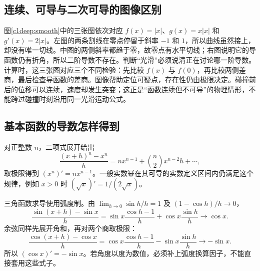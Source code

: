 \subsection{连续、可导与二次可导的图像区别}
图\ref{c1deep:smooth}中的三张图依次对应 $f(x)=|x|$、$g(x)=x|x|$ 和 $g'(x)=2|x|$。左图的两条割线在零点停留于斜率 $-1$ 和 $1$，所以曲线虽然接上，却没有唯一切线。中图的两侧斜率都趋于零，故零点有水平切线；右图说明它的导函数仍有折角，所以二阶导数不存在。判断“光滑”必须说清正在讨论哪一阶导数。
计算时，这三张图对应三个不同检验：先比较 $f(x)$ 与 $f(0)$，再比较两侧差商，最后检查导函数的差商。图像帮助定位可疑点，存在性仍由极限决定。碰撞前后的位移可以连续，速度却发生突变；这正是“函数连续但不可导”的物理情形，不能跨过碰撞时刻沿用同一光滑运动公式。


\subsection{基本函数的导数怎样得到}
对正整数 $n$，二项式展开给出
\[
 \frac{(x+h)^n-x^n}h
 =nx^{n-1}+\binom n2 x^{n-2}h+\cdots,
\]
取极限得到 $(x^n)'=nx^{n-1}$。一般实数幂在其可导的实数定义区间内仍满足这个规律，例如 $x>0$ 时 $(\sqrt x)'=1/(2\sqrt x)$。

三角函数求导使用弧度制。由 $\lim_{h\to0}\sin h/h=1$ 及
$(1-\cos h)/h\to0$，
\[
 \frac{\sin(x+h)-\sin x}h
 =\sin x\frac{\cos h-1}h+\cos x\frac{\sin h}h
 \longrightarrow\cos x.
\]
余弦同样先展开角和，再对两个商取极限：
\[
 \frac{\cos(x+h)-\cos x}{h}
 =\cos x\frac{\cos h-1}{h}-\sin x\frac{\sin h}{h}
 \longrightarrow-\sin x.
\]
所以 $(\cos x)'=-\sin x$。若角度以度为数值，必须补上弧度换算因子，不能直接套用这些式子。

